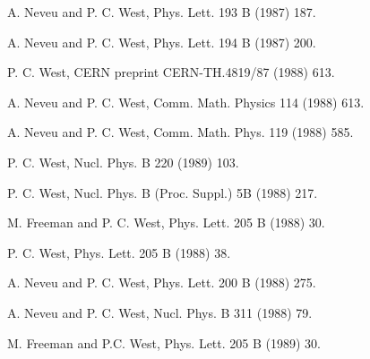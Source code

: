 \documentclass[a4paper,12pt]{article}
\begin{document}
\begin{thebibliography}{99}

 A. Neveu and P. C. West, Phys. Lett. 193 B (1987) 187.

A. Neveu and P. C. West, Phys. Lett. 194 B (1987) 200.

P. C. West, CERN preprint CERN-TH.4819/87 (1988) 613.

 A. Neveu and P. C. West, Comm. Math. Physics 114 (1988) 613.

 A. Neveu and P. C. West, Comm. Math. Phys. 119 (1988) 585.

 P. C. West, Nucl. Phys. B 220 (1989) 103.

 P. C. West, Nucl. Phys. B (Proc. Suppl.) 5B (1988) 217.

 M. Freeman and P. C. West, Phys. Lett. 205 B (1988) 30.

 P. C. West, Phys. Lett. 205 B (1988) 38.

 A. Neveu and P. C. West, Phys. Lett. 200 B (1988) 275.

A. Neveu and P. C. West, Nucl. Phys. B 311 (1988) 79.

M. Freeman and P.C. West, Phys. Lett. 205 B (1989) 30.

\end{thebibliography}
\end{document}
